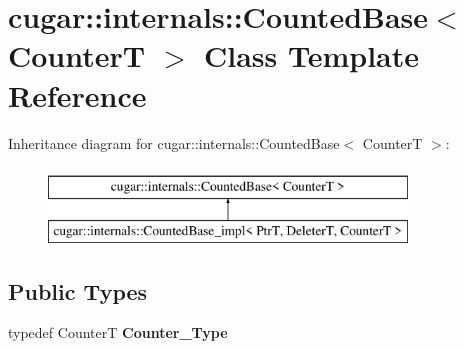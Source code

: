 \hypertarget{classcugar_1_1internals_1_1_counted_base}{}\section{cugar\+:\+:internals\+:\+:Counted\+Base$<$ CounterT $>$ Class Template Reference}
\label{classcugar_1_1internals_1_1_counted_base}
Inheritance diagram for cugar\+:\+:internals\+:\+:Counted\+Base$<$ CounterT $>$\+:\begin{figure}[H]
\begin{center}
\leavevmode
\includegraphics[height=2.000000cm]{classcugar_1_1internals_1_1_counted_base}
\end{center}
\end{figure}
\subsection*{Public Types}
\begin{DoxyCompactItemize}
\item 
\mbox{\label{classcugar_1_1internals_1_1_counted_base_a813feea4989204df059f1e57eb296661}} 
typedef CounterT {\bfseries Counter\+\_\+\+Type}
\end{DoxyCompactItemize}
